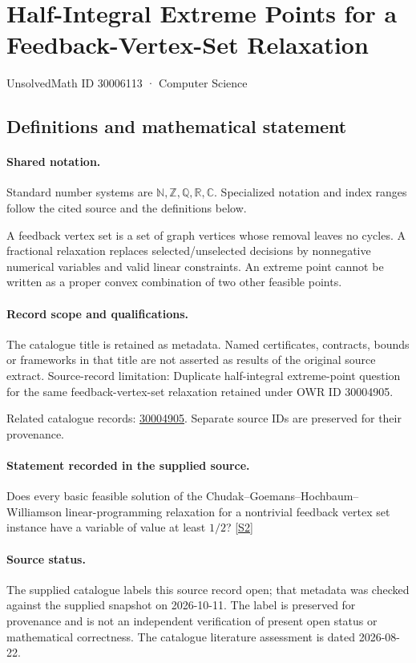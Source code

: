 \documentclass[11pt]{article}
\newcommand{\sref}[2]{\hyperlink{source:#1:#2}{[S#2]}}
\begin{document}
\setcounter{section}{30006112}
\section{Half-Integral Extreme Points for a Feedback-Vertex-Set Relaxation}\label{30006113}
{\small\sffamily UnsolvedMath ID 30006113 · Computer Science}
\subsection{Definitions and mathematical statement}

\paragraph{Shared notation.}Standard number systems are $\mathbb N,\mathbb Z,\mathbb Q,\mathbb R,\mathbb C$. Specialized notation and index ranges follow the cited source and the definitions below.


A feedback vertex set is a set of graph vertices whose removal leaves no cycles. A fractional relaxation replaces selected/unselected decisions by nonnegative numerical variables and valid linear constraints. An extreme point cannot be written as a proper convex combination of two other feasible points.
\paragraph{Record scope and qualifications.}
The catalogue title is retained as metadata. Named certificates, contracts, bounds or frameworks in that title are not asserted as results of the original source extract.
Source-record limitation: Duplicate half-integral extreme-point question for the same feedback-vertex-set relaxation retained under OWR ID 30004905.

Related catalogue records: \href{https://mehmetmars7.github.io/Erdosproblems-llm-hunter/problem.html?type=open_problems&id=30004905}{30004905}. Separate source IDs are preserved for their provenance.
\paragraph{Statement recorded in the supplied source.}
Does every basic feasible solution of the Chudak–Goemans–Hochbaum–Williamson linear-programming relaxation for a nontrivial feedback vertex set instance have a variable of value at least $1/2$? \sref{30006113}{2}
\paragraph{Source status.}
The supplied catalogue labels this source record open; that metadata was checked against the supplied snapshot on 2026-10-11. The label is preserved for provenance and is not an independent verification of present open status or mathematical correctness. The catalogue literature assessment is dated 2026-08-22.
\end{document}
